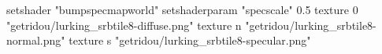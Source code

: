 setshader "bumpspecmapworld"
setshaderparam "specscale" 0.5
texture 0 "getridou/lurking_srbtile8-diffuse.png"
texture n "getridou/lurking_srbtile8-normal.png"
texture s "getridou/lurking_srbtile8-specular.png"